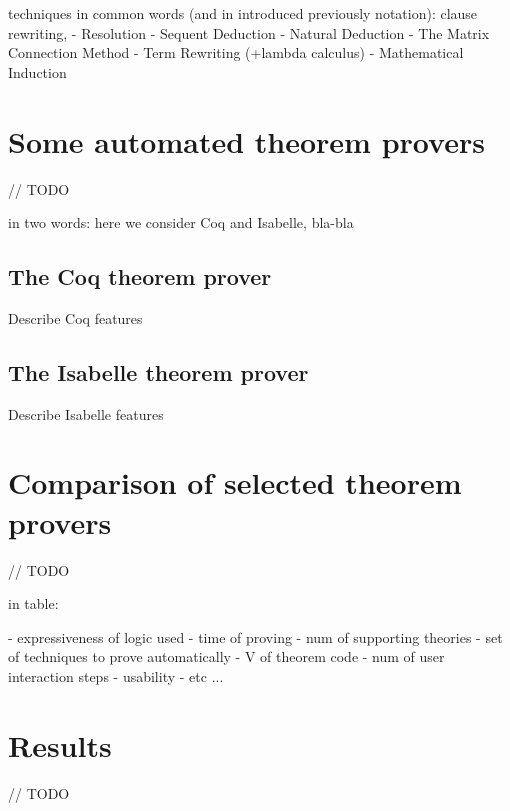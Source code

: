 \documentclass[article]{aaltoseries}
\begin{document}

techniques in common words (and in introduced previously notation): clause rewriting, 
- Resolution
- Sequent Deduction
- Natural Deduction
- The Matrix Connection Method
- Term Rewriting (+lambda calculus)
- Mathematical Induction




\section{Some automated theorem provers}
\label{sec:provers}
// TODO

in two words: here we consider Coq and Isabelle, bla-bla


\subsection{The Coq theorem prover}
\label{sec:prover_coq}

Describe Coq features


\subsection{The Isabelle theorem prover}
\label{sec:prover_isabelle}

Describe Isabelle features



\section{Comparison of selected theorem provers}
\label{sec:comparison}
// TODO

in table:

- expressiveness of logic used
- time of proving
- num of supporting theories
- set of techniques to prove automatically
- V of theorem code
- num of user interaction steps
- usability
- etc ...



\section{Results}
\label{sec:results}
// TODO
\end{document}
